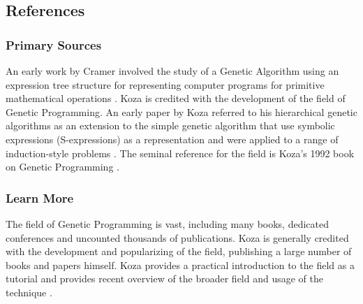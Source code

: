 

\subsection{References}

% 
% 
\subsubsection{Primary Sources}
An early work by Cramer involved the study of a Genetic Algorithm using an expression tree structure for representing computer programs for primitive mathematical operations \cite{Cramer1985}.
Koza is credited with the development of the field of Genetic Programming.
An early paper by Koza referred to his hierarchical genetic algorithms as an extension to the simple genetic algorithm that use symbolic expressions (S-expressions) as a representation and were applied to a range of induction-style problems \cite{Koza1989}.
The seminal reference for the field is Koza's 1992 book on Genetic Programming \cite{Koza1992}.


% 
% 
\subsubsection{Learn More}
The field of Genetic Programming is vast, including many books, dedicated conferences and uncounted thousands of publications.
Koza is generally credited with the development and popularizing of the field, publishing a large number of books and papers himself. 
Koza provides a practical introduction to the field as a tutorial and provides recent overview of the broader field and usage of the technique \cite{Koza2005}.

